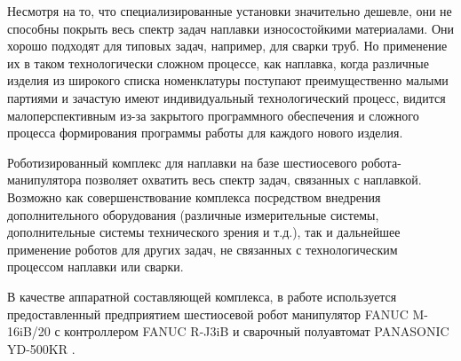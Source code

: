 Несмотря на то, что специализированные установки значительно дешевле, они не способны покрыть весь спектр задач наплавки износостойкими материалами.
Они хорошо подходят для типовых задач, например, для сварки труб.
Но применение их в таком технологически сложном процессе, как наплавка, когда различные изделия из широкого списка номенклатуры поступают преимущественно малыми партиями и зачастую имеют индивидуальный технологический процесс, видится малоперспективным из-за закрытого программного обеспечения и сложного процесса формирования программы работы для каждого нового изделия.

Роботизированный комплекс для наплавки на базе шестиосевого робота-манипулятора позволяет охватить весь спектр задач, связанных с наплавкой.
Возможно как совершенствование комплекса посредством внедрения дополнительного оборудования (различные измерительные системы, дополнительные системы технического зрения и т.д.), так и дальнейшее применение роботов для других задач, не связанных с технологическим процессом наплавки или сварки.

В качестве аппаратной составляющей комплекса, в работе используется предоставленный предприятием шестиосевой робот манипулятор FANUC M-16iB/20 с контроллером FANUC R-J3iB и сварочный полуавтомат PANASONIC YD-500KR .
